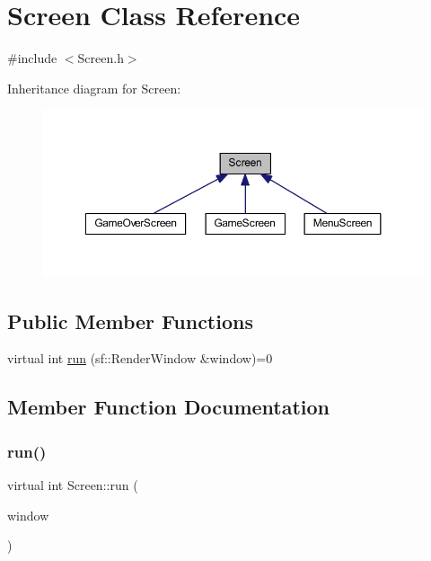 \hypertarget{class_screen}{}\section{Screen Class Reference}
\label{class_screen}


{\ttfamily \#include $<$Screen.\+h$>$}



Inheritance diagram for Screen\+:
\nopagebreak
\begin{figure}[H]
\begin{center}
\leavevmode
\includegraphics[width=350pt]{class_screen__inherit__graph}
\end{center}
\end{figure}
\subsection*{Public Member Functions}
\begin{DoxyCompactItemize}
\item 
virtual int \hyperlink{class_screen_aac0f7f072481e517dafc85ad292d6f00}{run} (sf\+::\+Render\+Window \&window)=0
\end{DoxyCompactItemize}


\subsection{Member Function Documentation}
\mbox{\label{class_screen_aac0f7f072481e517dafc85ad292d6f00}} 
\subsubsection{\texorpdfstring{run()}{run()}}
{\footnotesize\ttfamily virtual int Screen\+::run (\begin{DoxyParamCaption}\item[{sf\+::\+Render\+Window \&}]{window }\end{DoxyParamCaption})\hspace{0.3cm}{\ttfamily [pure virtual]}}



